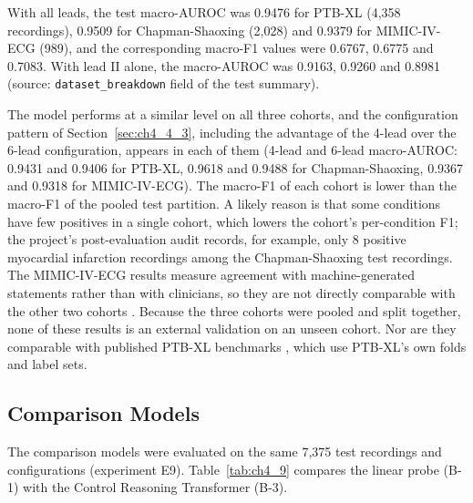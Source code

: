 With all leads, the test macro-AUROC was 0.9476 for PTB-XL (4,358 recordings), 0.9509 for Chapman-Shaoxing (2,028) and 0.9379 for MIMIC-IV-ECG (989), and the corresponding macro-F1 values were 0.6767, 0.6775 and 0.7083. With lead II alone, the macro-AUROC was 0.9163, 0.9260 and 0.8981 (source: \texttt{dataset\_breakdown} field of the test summary).

The model performs at a similar level on all three cohorts, and the configuration pattern of Section~\ref{sec:ch4_4_3}, including the advantage of the 4-lead over the 6-lead configuration, appears in each of them (4-lead and 6-lead macro-AUROC: 0.9431 and 0.9406 for PTB-XL, 0.9618 and 0.9488 for Chapman-Shaoxing, 0.9367 and 0.9318 for MIMIC-IV-ECG). The macro-F1 of each cohort is lower than the macro-F1 of the pooled test partition. A likely reason is that some conditions have few positives in a single cohort, which lowers the cohort's per-condition F1; the project's post-evaluation audit records, for example, only 8 positive myocardial infarction recordings among the Chapman-Shaoxing test recordings. The MIMIC-IV-ECG results measure agreement with machine-generated statements rather than with clinicians, so they are not directly comparable with the other two cohorts \cite{REYNA2022ISSUES}. Because the three cohorts were pooled and split together, none of these results is an external validation on an unseen cohort. Nor are they comparable with published PTB-XL benchmarks \cite{STRODTHOFF2021PTBXL}, which use PTB-XL's own folds and label sets.

\subsection{Comparison Models}\label{sec:ch4_4_6}

The comparison models were evaluated on the same 7,375 test recordings and configurations (experiment E9). Table~\ref{tab:ch4_9} compares the linear probe (B-1) with the Control Reasoning Transformer (B-3).

